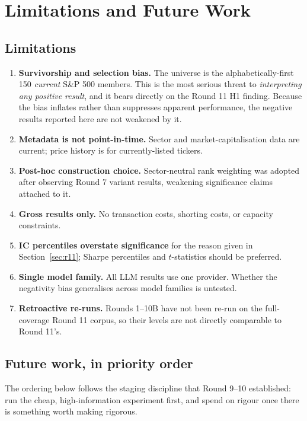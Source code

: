 \documentclass[11pt]{article}
\begin{document}
\section{Limitations and Future Work}
\label{sec:limits}

\subsection{Limitations}

\begin{enumerate}[leftmargin=1.6em,itemsep=0.25em]
  \item \textbf{Survivorship and selection bias.} The universe is the alphabetically-first
        150 \emph{current} S\&P 500 members. This is the most serious threat to
        \emph{interpreting any positive result}, and it bears directly on the Round 11 H1
        finding. Because the bias inflates rather than suppresses apparent performance,
        the negative results reported here are not weakened by it.
  \item \textbf{Metadata is not point-in-time.} Sector and market-capitalisation data are
        current; price history is for currently-listed tickers.
  \item \textbf{Post-hoc construction choice.} Sector-neutral rank weighting was adopted
        after observing Round 7 variant results, weakening significance claims attached to
        it.
  \item \textbf{Gross results only.} No transaction costs, shorting costs, or capacity
        constraints.
  \item \textbf{IC percentiles overstate significance} for the reason given in
        Section~\ref{sec:r11}; Sharpe percentiles and $t$-statistics should be preferred.
  \item \textbf{Single model family.} All LLM results use one provider. Whether the
        negativity bias generalises across model families is untested.
  \item \textbf{Retroactive re-runs.} Rounds 1--10B have not been re-run on the
        full-coverage Round 11 corpus, so their levels are not directly comparable to
        Round 11's.
\end{enumerate}

\subsection{Future work, in priority order}

The ordering below follows the staging discipline that Round 9--10 established: run the
cheap, high-information experiment first, and spend on rigour once there is something
worth making rigorous.
\end{document}
